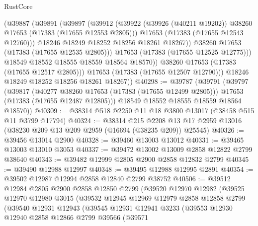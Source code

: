 \begin{lexlean}{RustCore}
\begin{coremodule}
                  (@39887
                    (@39891
                      (@39897
                        (@39912
                          (@39922
                            (@39926 (@40211 @19202))
                            @38260
                            @17653
                            (@17383 (@17655 @12553 @2805)))
                          @17653
                          (@17383 (@17655 @12543 @12760)))
                        @18246
                        @18249
                        @18252
                        @18256
                        @18261
                        @18267))
                    @38260
                    @17653
                    (@17383 (@17655 @12535 @2805)))
                  @17653
                  (@17383 (@17655 @12525 @12775)))
                @18549
                @18552
                @18555
                @18559
                @18564
                @18570))
            @38260
            @17653
            (@17383 (@17655 @12517 @2805)))
          @17653
          (@17383 (@17655 @12507 @12790)))
        @18246
        @18249
        @18252
        @18256
        @18261
        @18267))
@40298 := @39787
    (@39791
      (@39797
        (@39817
          (@40277 @38260 @17653 (@17383 (@17655 @12499 @2805)))
          @17653
          (@17383 (@17655 @12487 @12805)))
        @18549
        @18552
        @18555
        @18559
        @18564
        @18570))
@40309 := @38314 @518 @2250 @11 @18 @3800 @13017 (@38458 @515 @11 @3799 @17794)
@40324 := @38314
    @215
    @2208
    @13
    @17
    @2959
    @13016
    (@38230 @209 @13 @209 @2959 (@16694 (@38235 @209)) @25545)
@40326 := @39456 @13014 @2900
@40328 := @39460 @13003 @13012
@40331 := @39465 @13003 @13010 @3053
@40337 := @39472 @13002 @13009 @2858 @12822 @2799 @38640
@40343 := @39482 @12999 @2805 @2900 @2858 @12832 @2799
@40345 := @39490 @12988 @12997
@40348 := @39495 @12988 @12995 @2891
@40354 := @39502 @12987 @12994 @2858 @12840 @2799 @38752
@40506 := @39512
    @12984
    @2805
    @2900
    @2858
    @12850
    @2799
    (@39520
      @12970
      @12982
      (@39525
        @12970
        @12980
        @3015
        (@39532
          @12945
          @12969
          @12979
          @2858
          @12858
          @2799
          (@39540
            @12931
            @12943
            (@39545
              @12931
              @12941
              @3233
              (@39553
                @12930
                @12940
                @2858
                @12866
                @2799
                @39566
                (@39571

\end{coremodule}
\end{lexlean}
